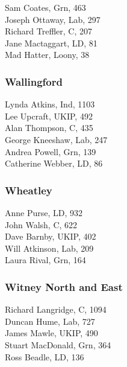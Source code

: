 \documentclass[a4paper,openany,10pt]{book}
\begin{document}


Sam Coates, Grn, 463\\
Joseph Ottaway, Lab, 297\\
Richard Treffler, C, 207\\
Jane Mactaggart, LD, 81\\
Mad Hatter, Loony, 38\\


\subsubsection*{Wallingford}



Lynda Atkins, Ind, 1103\\
Lee Upcraft, UKIP, 492\\
Alan Thompson, C, 435\\
George Kneeshaw, Lab, 247\\
Andrea Powell, Grn, 139\\
Catherine Webber, LD, 86\\


\subsubsection*{Wheatley}



Anne Purse, LD, 932\\
John Walsh, C, 622\\
Dave Barnby, UKIP, 402\\
Will Atkinson, Lab, 209\\
Laura Rival, Grn, 164\\


\subsubsection*{Witney North and East}



Richard Langridge, C, 1094\\
Duncan Hume, Lab, 727\\
James Mawle, UKIP, 490\\
Stuart MacDonald, Grn, 364\\
Ross Beadle, LD, 136\\
\end{document}
